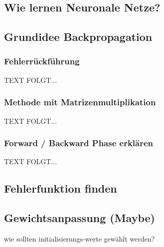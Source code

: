 \subsection{Wie lernen Neuronale Netze?}\label{subsec:backpropagation:lernen_nn}

\subsection{Grundidee Backpropagation}\label{subsec:backpropagation:grundiee}
\subsubsection{Fehlerrückführung}\label{subsec:backpropagation:fehlerrueckfuehrung}
  TEXT FOLGT...

\subsubsection{Methode mit Matrizenmultiplikation}\label{subsec:backpropagation:matrizen}
  TEXT FOLGT...

\subsubsection{Forward / Backward Phase erklären}\label{subsec:backpropagation:forward_backward}
  TEXT FOLGT...

\subsection{Fehlerfunktion finden}\label{subsec:backpropagation:fehlerfunktion}

\subsection{Gewichtsanpassung (Maybe)}\label{subsec:backpropagation:gewichtsanpassung}
wie sollten initialisierungs-werte gewählt werden?

